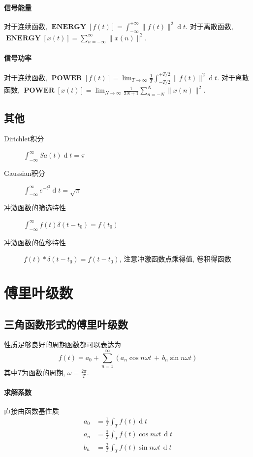 \documentclass{ctexart}
\DeclareMathOperator{\ENERGY}{\mathbf{ENERGY}}
\DeclareMathOperator{\POWER}{\mathbf{POWER}}
\DeclareMathOperator{\ud}{\mathrm{d}}
\begin{document}
\paragraph{信号能量} 对于连续函数, $\ENERGY[f(t)] = \int_{-\infty}^{+\infty} \|f(t)\|^2 \ud t$.
    对于离散函数, $\ENERGY[x(t)] = \sum_{n = -\infty}^{\infty} \|x(n)\|^2$.
\paragraph{信号功率} 对于连续函数, $\POWER[f(t)] = \lim_{T \to \infty} \frac{1}{T} \int_{-T/2}^{+T/2} \|f(t)\|^2 \ud t$.
    对于离散函数, $\POWER[x(t)] = \lim_{N \to \infty} \frac{1}{2N + 1} \sum_{n = -N}^{N} \|x(n)\|^2$.
\subsection{其他}
    \begin{description}
        \item[Dirichlet积分] $\int_{-\infty}^{\infty} Sa(t) \ud t = \pi$
        \item[Gaussian积分] $\int_{-\infty}^{\infty} e^{-t^2} \ud t = \sqrt{\pi}$
        \item[冲激函数的筛选特性] $\int_{-\infty}^{\infty} f(t) \delta(t - t_0) = f(t_0)$
        \item[冲激函数的位移特性] $f(t) * \delta(t - t_0) = f(t - t_0)$, 注意冲激函数点乘得值, 卷积得函数
    \end{description}

\section{傅里叶级数}
\subsection{三角函数形式的傅里叶级数}
    性质足够良好的周期函数都可以表达为\[
        f(t) = a_0 + \sum_{n = 1}^{\infty} \left( a_n \cos n\omega t \,+\, b_n \sin n\omega t \right)\]
    其中$T$为函数的周期, $\omega = \frac{2\pi}{T}$.
\paragraph{求解系数}
    直接由函数基性质\begin{align*}
        a_0 &= \frac{1}{T} \int_T f(t) \ud t\\
        a_n &= \frac{2}{T} \int_T f(t) \cos n\omega t \,\ud t\\
        b_n &= \frac{2}{T} \int_T f(t) \sin n\omega t \,\ud t
    \end{align*}
\end{document}
